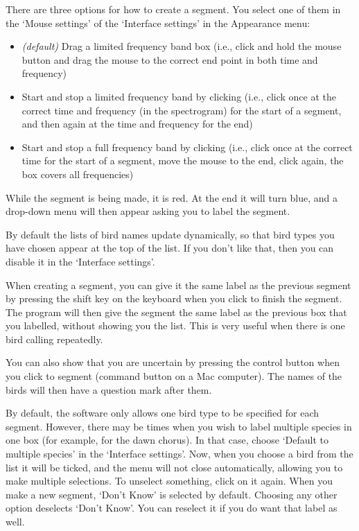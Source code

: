 \documentclass{article}
\begin{document}
There are three options for how to create a segment. You select one of them in the `Mouse settings' of the `Interface settings' in the Appearance menu:
	\begin{itemize}
	\item {\em (default)} Drag a limited frequency band box (i.e., click and hold the mouse button and drag the mouse to the correct end point in both time and frequency)
	\item Start and stop a limited frequency band by clicking (i.e., click once at the correct time and frequency (in the spectrogram) for the start of a segment, and then again at the time and frequency for the end)
	\item Start and stop a full frequency band by clicking (i.e., click once at the correct time for the start of a segment, move the mouse to the end, click again, the box covers all frequencies)
	\end{itemize}

While the segment is being made, it is red. At the end it will turn blue, and a drop-down menu will then appear asking you to label the segment. 

By default the lists of bird names update dynamically, so that bird types you have chosen appear at the top of the list. If you don't like that, then you can disable it in the `Interface settings'. 

When creating a segment, you can give it the same label as the previous segment by pressing the shift key on the keyboard when you click to finish the segment. The program will then give the segment the same label as the previous box that you labelled, without showing you the list. This is very useful when there is one bird calling repeatedly.

You can also show that you are uncertain by pressing the control button when you click to segment (command button on a Mac computer). The names of the birds will then have a question mark after them. 

By default, the software only allows one bird type to be specified for each segment. However, there may be times when you wish to label multiple species in one box (for example, for the dawn chorus). In that case, choose `Default to multiple species' in the `Interface settings'. Now, when you choose a bird from the list it will be ticked, and the menu will not close automatically, allowing you to make multiple selections. To unselect something, click on it again. When you make a new segment, `Don't Know' is selected by default. Choosing any other option deselects `Don't Know'. You can reselect it if you do want that label as well. 
\end{document}
